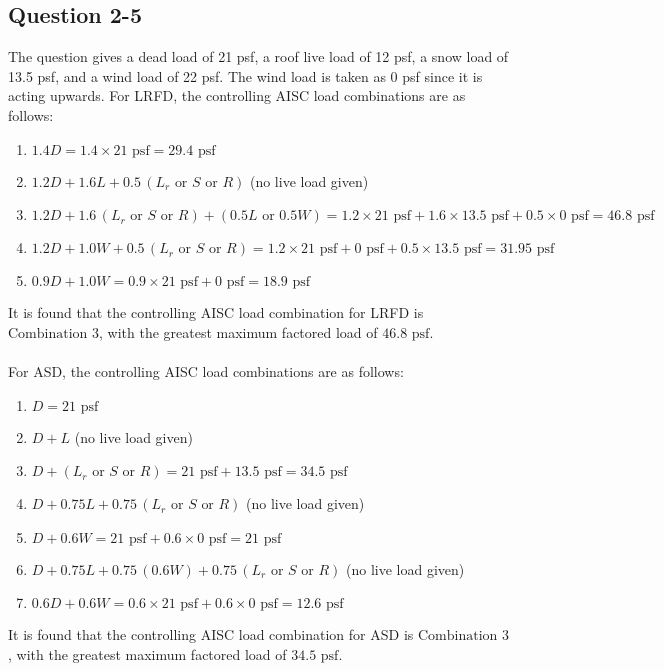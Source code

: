 \documentclass{article}
\begin{document}
    \subsection*{Question 2-5}
    \noindent The question gives a dead load of 21 psf, a roof live load of 12 psf, a snow load of 13.5 psf, and a wind load of 22 psf. The wind load is taken as 0 psf since it is acting upwards. For LRFD, the controlling AISC load combinations are as follows:
    \begin{enumerate}
        \item \(1.4D = 1.4\times 21\text{ psf}=29.4\text{ psf}\) 
        \item \(1.2D+1.6L+0.5\,(L_r\text{ or }S\text{ or }R)\) (no live load given)
        \item \(1.2D+1.6\,(L_r\text{ or }S\text{ or }R)+(0.5L\text{ or }0.5W)=1.2\times 21\text{ psf}+1.6\times13.5\text{ psf}+0.5\times 0\text{ psf}=46.8\text{ psf} \)
        \item \(1.2D+1.0W+0.5\,(L_r\text{ or }S\text{ or }R)=1.2\times 21\text{ psf}+0\text{ psf}+0.5\times13.5\text{ psf}=31.95\text{ psf}\)
        \item \(0.9D+1.0W=0.9\times 21\text{ psf}+0\text{ psf}=18.9\text{ psf}\)
    \end{enumerate}
    It is found that the controlling AISC load combination for LRFD is \(\boxed{\text{Combination 3}}\), with the greatest maximum factored load of \(\boxed{46.8\text{ psf}}\). 
    \\\\For ASD, the controlling AISC load combinations are as follows: 
    \begin{enumerate}
        \item \(D=21\text{ psf}\) 
        \item \(D+L\) (no live load given)
        \item \(D+(L_r\text{ or }S\text{ or }R)=21\text{ psf}+13.5\text{ psf}=34.5\text{ psf}\)
        \item \(D+0.75L+0.75\,(L_r\text{ or }S\text{ or }R)\) (no live load given)
        \item \(D+0.6W=21\text{ psf}+0.6\times0\text{ psf}=21\text{ psf}\)
        \item \(D+0.75L+0.75\,(0.6W)+0.75\,(L_r\text{ or }S\text{ or }R)\) (no live load given)
        \item \(0.6D+0.6W=0.6\times21\text{ psf}+0.6\times0\text{ psf}=12.6\text{ psf}\)
    \end{enumerate}
    It is found that the controlling AISC load combination for ASD is \(\boxed{\text{Combination 3}}\), with the greatest maximum factored load of \(\boxed{34.5\text{ psf}}\).
\end{document}

